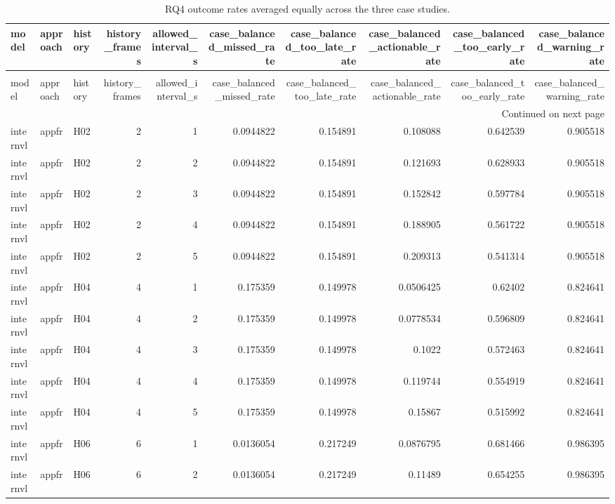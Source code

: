 \begin{longtable}{lllrrrrrrr}
\caption{RQ4 outcome rates averaged equally across the three case studies.} \label{tab:rq4-case-balanced-summary} \\
\toprule
model & approach & history & history\_frames & allowed\_interval\_s & case\_balanced\_missed\_rate & case\_balanced\_too\_late\_rate & case\_balanced\_actionable\_rate & case\_balanced\_too\_early\_rate & case\_balanced\_warning\_rate \\
\midrule
\endfirsthead
\caption[]{RQ4 outcome rates averaged equally across the three case studies.} \\
\toprule
model & approach & history & history\_frames & allowed\_interval\_s & case\_balanced\_missed\_rate & case\_balanced\_too\_late\_rate & case\_balanced\_actionable\_rate & case\_balanced\_too\_early\_rate & case\_balanced\_warning\_rate \\
\midrule
\endhead
\midrule
\multicolumn{10}{r}{Continued on next page} \\
\midrule
\endfoot
\bottomrule
\endlastfoot
internvl & appfr & H02 & 2 & 1 & 0.0944822 & 0.154891 & 0.108088 & 0.642539 & 0.905518 \\
internvl & appfr & H02 & 2 & 2 & 0.0944822 & 0.154891 & 0.121693 & 0.628933 & 0.905518 \\
internvl & appfr & H02 & 2 & 3 & 0.0944822 & 0.154891 & 0.152842 & 0.597784 & 0.905518 \\
internvl & appfr & H02 & 2 & 4 & 0.0944822 & 0.154891 & 0.188905 & 0.561722 & 0.905518 \\
internvl & appfr & H02 & 2 & 5 & 0.0944822 & 0.154891 & 0.209313 & 0.541314 & 0.905518 \\
internvl & appfr & H04 & 4 & 1 & 0.175359 & 0.149978 & 0.0506425 & 0.62402 & 0.824641 \\
internvl & appfr & H04 & 4 & 2 & 0.175359 & 0.149978 & 0.0778534 & 0.596809 & 0.824641 \\
internvl & appfr & H04 & 4 & 3 & 0.175359 & 0.149978 & 0.1022 & 0.572463 & 0.824641 \\
internvl & appfr & H04 & 4 & 4 & 0.175359 & 0.149978 & 0.119744 & 0.554919 & 0.824641 \\
internvl & appfr & H04 & 4 & 5 & 0.175359 & 0.149978 & 0.15867 & 0.515992 & 0.824641 \\
internvl & appfr & H06 & 6 & 1 & 0.0136054 & 0.217249 & 0.0876795 & 0.681466 & 0.986395 \\
internvl & appfr & H06 & 6 & 2 & 0.0136054 & 0.217249 & 0.11489 & 0.654255 & 0.986395 \\

\end{longtable}
